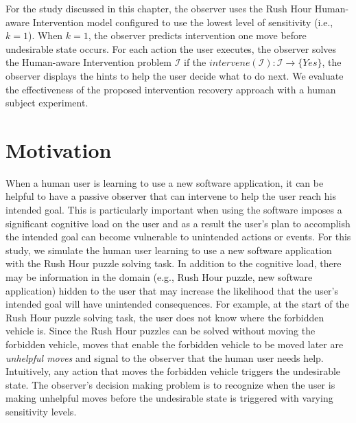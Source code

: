 For the study discussed in this chapter, the observer uses the Rush Hour Human-aware Intervention model configured to use the lowest level of sensitivity (i.e., $k=1$).
When $k=1$, the observer predicts intervention one move before undesirable state occurs.
For each action the user executes, the observer solves the Human-aware Intervention problem $\mathcal{I}$ if the $intervene (\mathcal{I}) :  \mathcal{I} \rightarrow \{Yes\} $, the observer displays the hints to help the user decide what to do next.
We evaluate the effectiveness of the proposed intervention recovery approach with a human subject experiment.


\section{Motivation}
When a human user is learning to use a new software application, it can be helpful to have a passive observer that can intervene to help the user reach his intended goal. 
This is particularly important when using the software imposes a significant cognitive load on the user and as a result the user's plan to accomplish the intended goal can become vulnerable to unintended actions or events.
For this study, we simulate the human user learning to use a new software application with the Rush Hour puzzle solving task.
In addition to the cognitive load, there may be information in the domain (e.g., Rush Hour puzzle, new software application) hidden to the user that may increase the likelihood that the user's intended goal will have unintended consequences. 
For example, at the start of the Rush Hour puzzle solving task, the user does not know where the forbidden vehicle is.
Since the Rush Hour puzzles can be solved without moving the forbidden vehicle, moves that enable the forbidden vehicle to be moved later are \textit{unhelpful moves} and signal to the observer that the human user needs help. 
Intuitively, any action that moves the forbidden vehicle triggers the undesirable state.
The observer's decision making problem is to recognize when the user is making unhelpful moves before the undesirable state is triggered with varying sensitivity levels.


